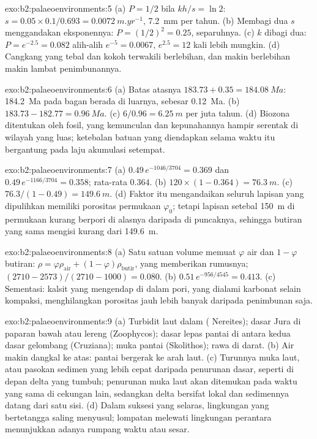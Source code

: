 \begin{solution}{exo:b2:palaeoenvironments:5}
(a) $P = 1/2$ bila $kh/s = \ln 2$: $s = 0.05 \times 0.1/0.693 = \qty{0.0072}{m.yr^{-1}}$,
\qty{7.2}{mm} per tahun. (b) Membagi dua $s$ menggandakan eksponennya: $P = (1/2)^2 = 0.25$, separuhnya.
(c) $k$ dibagi dua: $P = e^{-2.5} = 0.082$ alih-alih $e^{-5} = 0.0067$, $e^{2.5} = 12$ kali lebih
mungkin. (d) Cangkang yang tebal dan kokoh terwakili berlebihan, dan makin berlebihan makin lambat penimbunannya.
\end{solution}

\begin{solution}{exo:b2:palaeoenvironments:6}
(a) Batas atasnya $183.73 + 0.35 = \qty{184.08}{Ma}$: \qty{184.2}{Ma} pada bagan berada
di luarnya, sebesar \qty{0.12}{Ma}. (b) $183.73 - 182.77 = \qty{0.96}{Ma}$. (c) $6/0.96 =
\qty{6.25}{m}$ per juta tahun. (d) Biozona ditentukan oleh fosil, yang kemunculan dan
kepunahannya hampir serentak di wilayah yang luas; ketebalan batuan yang diendapkan selama
waktu itu bergantung pada laju akumulasi setempat.
\end{solution}

\begin{solution}{exo:b2:palaeoenvironments:7}
(a) $0.49\,e^{-1046/3704} = 0.369$ dan $0.49\,e^{-1166/3704} = 0.358$; rata-rata $0.364$. (b) $120
\times (1 - 0.364) = \qty{76.3}{m}$. (c) $76.3/(1 - 0.49) = \qty{149.6}{m}$. (d) Faktor itu
mengandaikan seluruh lapisan yang dipulihkan memiliki porositas permukaan $\varphi_0$; tetapi lapisan
setebal \qty{150}{m} di permukaan kurang berpori di alasnya daripada di puncaknya, sehingga butiran yang sama
mengisi kurang dari \qty{149.6}{m}.
\end{solution}

\begin{solution}{exo:b2:palaeoenvironments:8}
(a) Satu satuan volume memuat $\varphi$ air dan $1 - \varphi$ butiran: $\rho = \varphi
\rho_{\text{air}} + (1 - \varphi)\rho_{\text{butir}}$, yang memberikan rumusnya; $(2710 -
2573)/(2710 - 1000) = 0.080$. (b) $0.51\,e^{-956/4545} = 0.413$. (c) Sementasi: kalsit yang
mengendap di dalam pori, yang dialami karbonat selain kompaksi, menghilangkan porositas jauh lebih banyak
daripada penimbunan saja.
\end{solution}

\begin{solution}{exo:b2:palaeoenvironments:9}
(a) Turbidit laut dalam ( Nereites); dasar Jura di paparan bawah atau lereng
(Zoophycos); dasar lepas pantai di antara kedua dasar gelombang (Cruziana); muka pantai (Skolithos);
rawa di darat. (b) Air makin dangkal ke atas: pantai bergerak ke arah laut. (c) Turunnya muka laut,
atau pasokan sedimen yang lebih cepat daripada penurunan dasar, seperti di depan delta yang tumbuh; penurunan muka laut akan
ditemukan pada waktu yang sama di cekungan lain, sedangkan delta bersifat lokal dan sedimennya datang
dari satu sisi. (d) Dalam suksesi yang selaras, lingkungan yang bertetangga saling menyusul;
lompatan melewati lingkungan perantara menunjukkan adanya rumpang waktu atau sesar.
\end{solution}

